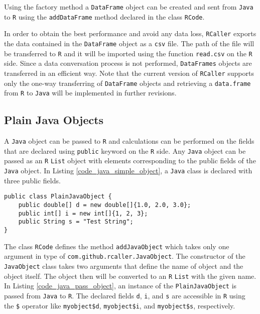 \documentclass[10pt,a4paper, final, oneside]{article}
\begin{document}
Using the factory method a \texttt{DataFrame} object can be created and sent from \texttt{Java} to \texttt{R} using the \texttt{addDataFrame} method declared in the class \texttt{RCode}. 

In order to obtain the best performance and avoid any data loss, \texttt{RCaller} exports the data contained in the \texttt{DataFrame} object as a \texttt{csv} file. The path of the file will be transferred to \texttt{R} and it will be imported using the function \texttt{read.csv} on the \texttt{R} side. 
Since a data conversation process is not performed, \texttt{DataFrames} objects are transferred in an efficient way. 
Note that the current version of \texttt{RCaller} supports only the one-way transferring of \texttt{DataFrame} objects and retrieving a \texttt{data.frame} from \texttt{R} to \texttt{Java} will be implemented in further revisions. 


\subsection{Plain Java Objects}
\label{sec:passing_pojos}
A \texttt{Java} object can be passed to \texttt{R} and calculations can be performed on the fields that are declared using \texttt{public} keyword on the \texttt{R} side. Any \texttt{Java} object can be passed as an \texttt{R} \texttt{List} object with elements corresponding to the public fields of the \texttt{Java} object. In Listing \ref{code_java_simple_object}, a \texttt{Java} class is declared with three public fields. 

\begin{minipage}{\linewidth}
\begin{lstlisting}[caption=A Plain Java Object Class,label=code_java_simple_object]
public class PlainJavaObject {
    public double[] d = new double[]{1.0, 2.0, 3.0};
    public int[] i = new int[]{1, 2, 3};
    public String s = "Test String";
}
\end{lstlisting}
\end{minipage}

The class \texttt{RCode} defines the method \texttt{addJavaObject} which takes only one argument in type of \texttt{com.github.rcaller.JavaObject}. The constructor of the \texttt{JavaObject} class takes two arguments that define the name of object and the object itself. The object then will be converted to an \texttt{R} \texttt{List} with the given name. In Listing \ref{code_java_pass_object}, an instance of the \texttt{PlainJavaObject} is passed from \texttt{Java} to \texttt{R}. The declared fields \texttt{d}, \texttt{i}, and \texttt{s} are accessible in \texttt{R} using the \texttt{\$} operator like \texttt{myobject\$d}, \texttt{myobject\$i}, and \texttt{myobject\$s}, respectively.
\end{document}
